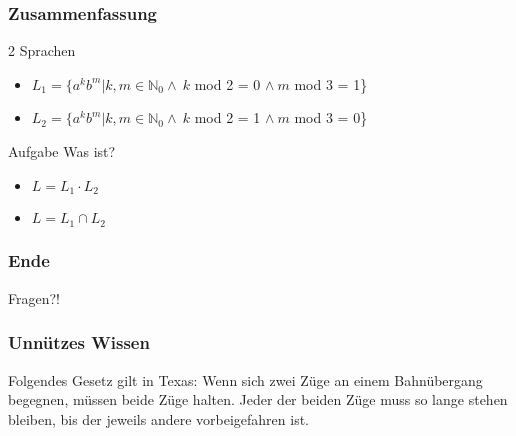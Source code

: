 \documentclass{beamer}
\begin{document}
\begin{frame}
\frametitle{Zusammenfassung}
\begin{block}{2 Sprachen}
\begin{itemize}
  \item $L_{1} = \{a^{k}b^{m}|k,m \in \mathbb N_{0} \land \ k$ mod 2 = 0 $\land
  \ m$ mod 3 = 1\}
  \item $L_{2} = \{a^{k}b^{m}|k,m \in \mathbb N_{0} \land \ k$ mod 2 = 1 $\land
  \ m$ mod 3 = 0\}
\end{itemize}
\end{block}
\begin{block}{Aufgabe}
Was ist?
\begin{itemize}
 \item $ L = L_1 \cdot L_2$
 \item $ L = L_1 \cap L_2$
\end{itemize}
\end{block}
\end{frame}

\begin {frame}
\frametitle {Ende}
	\begin {center}
	Fragen?! \\
	\end {center}
\end {frame}

\begin{frame}
		\frametitle{Unnützes Wissen}
		\begin{block}{}
			\begin{center}
				Folgendes Gesetz gilt in Texas: Wenn sich zwei Züge an einem Bahnübergang begegnen, müssen beide Züge halten. Jeder der beiden Züge muss so lange stehen 					bleiben, bis der jeweils andere vorbeigefahren ist. 
			\end{center}
		\end{block}{}
\end{frame}
\end{document}
